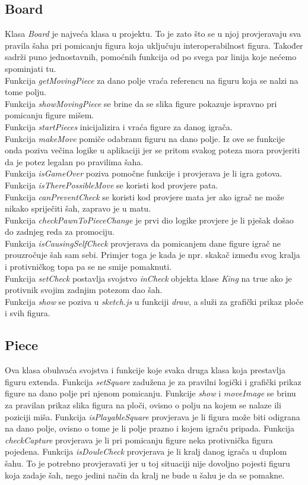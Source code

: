 \documentclass[11pt]{article}
\begin{document}
\subsection{Board}
Klasa \textit{Board} je najveća klasa u projektu. To je zato što se u njoj provjeravaju sva pravila šaha pri pomicanju figura koja
uključuju interoperabilnost figura. Također sadrži puno jednostavnih, pomoćnih funkcija od po svega par linija koje nećemo spominjati tu.\\
Funkcija \textit{getMovingPiece} za dano polje vraća referencu na figuru koja se nalzi na tome polju.\\
Funkcija \textit{showMovingPiece} se brine da se slika figure pokazuje ispravno pri pomicanju figure mišem.\\
Funkcija \textit{startPieces} inicijalizira i vraća figure za danog igrača.\\
Funkcija \textit{makeMove} pomiče odabranu figuru na dano polje. Iz ove se funkcije onda poziva večina logike u aplikaciji jer se pritom svakog
poteza mora provjeriti da je potez legalan po pravilima šaha.\\  
Funkcija \textit{isGameOver} poziva pomočne funkcije i provjerava je li igra gotova.
Funkcija \textit{isTherePossibleMove} se koristi kod provjere pata.\\
Funkcija \textit{canPreventCheck} se koristi kod provjere mata jer ako igrač ne može nikako spriječiti šah, zapravo je u matu.\\
Funkcija \textit{checkPawnToPieceChange} je prvi dio logike provjere je li pješak došao do zadnjeg reda za promociju. \\
Funkcija \textit{isCausingSelfCheck} provjerava da pomicanjem dane figure igrač ne prouzročuje šah sam sebi. Primjer toga je kada je
npr. skakač između svog kralja i protivničkog topa pa se ne smije pomaknuti.\\
Funkcija \textit{setCheck} postavlja svojstvo \textit{inCheck} objekta klase \textit{King} na true ako je protivnik svojim zadnjim potezom
dao šah.\\
Funkcija \textit{show} se poziva u \textit{sketch.js} u funkciji \textit{draw}, a služi za grafički prikaz ploče i svih figura. 

\subsection{Piece}
Ova klasa obuhvaća svojstva i funkcije koje svaka druga klasa koja prestavlja figuru extenda.
Funkcija \textit{setSquare} zadužena je za pravilni logički i grafički prikaz figure na dano polje pri njenom pomicanju. 
Funkcije \textit{show} i \textit{moveImage} se brinu za pravilan prikaz slika figura na ploči, ovisno o polju na kojem se nalaze ili poziciji miša.
Funkcija \textit{isPlayableSquare} provjerava je li figura može biti odigrana na dano polje, ovisno o tome je li polje prazno i kojem igraču pripada.
Funkcija \textit{checkCapture} provjerava je li pri pomicanju figure neka protivnička figura pojedena.
Funkcija \textit{isDouleCheck} provjerava je li kralj danog igrača u duplom šahu. To je potrebno provjeravati jer u toj situaciji nije dovoljno pojesti
figuru koja zadaje šah, nego jedini način da kralj ne bude u šahu je da se pomakne.
\end{document}
